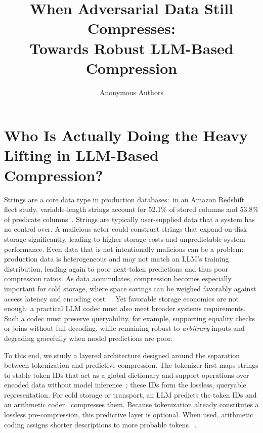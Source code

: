 \documentclass{article}
\title{When Adversarial Data Still Compresses:\\Towards Robust LLM-Based Compression}
\author{Anonymous Authors}
\begin{document}
\maketitle



\section{Who Is Actually Doing the Heavy Lifting in LLM-Based Compression?}

Strings are a core data type in production databases:~in an Amazon Redshift fleet study, variable-length strings account for 52.1\% of stored columns and 53.8\% of predicate columns~\citep{vanrenen2024tpc}.
Strings are typically user-supplied data that a system has no control over. A malicious actor could construct strings that expand on-disk storage significantly, leading to higher storage costs and unpredictable system performance.
Even data that is not intentionally malicious can be a problem: production data is heterogeneous and may not match an LLM’s training distribution, leading again to poor next-token predictions and thus poor compression ratios. As data accumulates, compression becomes especially important for cold storage, where space savings can be weighed favorably against access latency and encoding cost ~\citep{kipf2026waiting}. Yet favorable storage economics are not enough: a practical LLM codec must also meet broader systems requirements. Such a codec must preserve queryability, for example, supporting equality checks or joins without full decoding, while remaining robust to \emph{arbitrary} inputs and degrading gracefully when model predictions are poor.

To this end, we study a layered architecture designed around the separation between tokenization and predictive compression. The tokenizer first maps strings to stable token IDs that act as a global dictionary and support operations over encoded data without model inference~\citep{schmidt2026accelerating}; these IDs form the lossless, queryable representation.  For cold storage or transport, an LLM predicts the token IDs and an arithmetic coder~\cite{witten1987arithmetic} compresses them. Because tokenization already constitutes a lossless pre-compression, this predictive layer is optional. When used, arithmetic coding assigns shorter descriptions to more probable tokens ~\citep{witten1987arithmetic,steinruecken2015lossless}.
\end{document}
